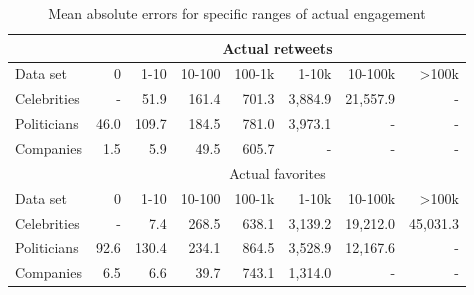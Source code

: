 \begin{table}
\centering
  \begin{tabular}{lrrrrrrr}
    \toprule
    & \multicolumn{7}{c}{Actual retweets} \\
    \midrule
    Data set & 0 & 1-10 & 10-100 & 100-1k & 1-10k & 10-100k & >100k \\
    \midrule
    Celebrities & - & 51.9 & 161.4 & 701.3 & 3,884.9 & 21,557.9 & - \\
    Politicians & 46.0 & 109.7 & 184.5 & 781.0 & 3,973.1 & - & - \\
    Companies & 1.5 & 5.9 & 49.5 & 605.7 & - & - & - \\
    \bottomrule
    \toprule
    & \multicolumn{7}{c}{Actual favorites} \\
    \midrule
    Data set & 0 & 1-10 & 10-100 & 100-1k & 1-10k & 10-100k & >100k \\
    \midrule
    Celebrities & - & 7.4 & 268.5 & 638.1 & 3,139.2 & 19,212.0 & 45,031.3 \\
    Politicians & 92.6 & 130.4 & 234.1 & 864.5 & 3,528.9 & 12,167.6 & - \\
    Companies & 6.5 & 6.6 & 39.7 & 743.1 & 1,314.0 & - & - \\
    \bottomrule
  \end{tabular}
  \caption{Mean absolute errors for specific ranges of actual engagement}
  \label{tab:d1_regression_eval}
\end{table}


